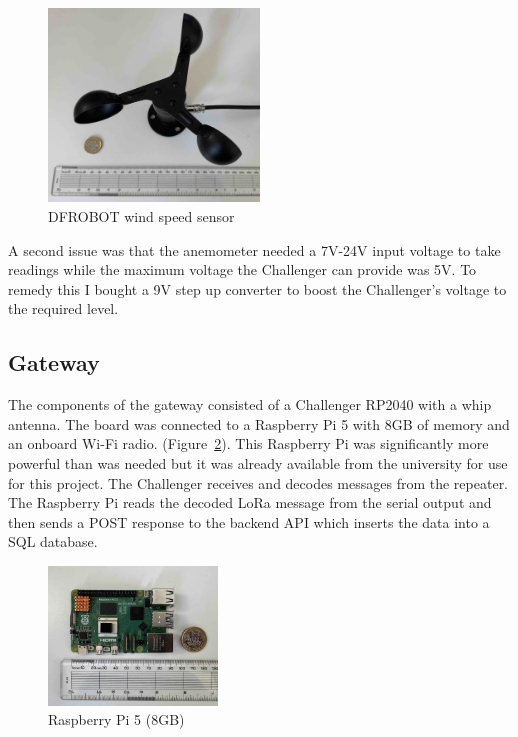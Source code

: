\begin{figure}[H]
    \centering
    \includegraphics[width=0.5\textwidth]{contents/part-2/fig2/wind-sensor.jpg}
    \caption{DFROBOT wind speed sensor}
    \label{fig:wind-sensor}
\end{figure}

A second issue was that the anemometer needed a 7V-24V input voltage to take
readings while the maximum voltage the Challenger can provide was 5V. To remedy
this I bought a 9V step up converter to boost the Challenger's voltage to the
required level.

\subsection{Gateway}

The components of the gateway consisted of a Challenger RP2040 with a whip
antenna. The board was connected to a Raspberry Pi 5 with 8GB of memory and an
onboard Wi-Fi radio. (Figure~\ref{fig:raspberry-pi}). This Raspberry Pi was
significantly more powerful than was needed but it was already available from
the university for use for this project. The Challenger receives and decodes
messages from the repeater. The Raspberry Pi reads the decoded LoRa message from
the serial output and then sends a POST response to the backend API which
inserts the data into a SQL database.

\begin{figure}[H]
    \centering
    \includegraphics[width=0.4\textwidth]{contents/part-2/fig2/raspberry-pi.jpg}
    \caption{Raspberry Pi 5 (8GB)}
    \label{fig:raspberry-pi}
\end{figure}

